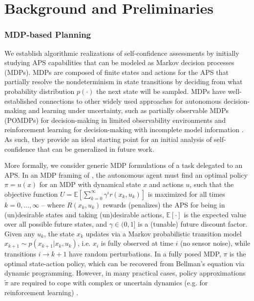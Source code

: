 \section{Background and Preliminaries} \label{sec:background}

\subsubsection{MDP-based Planning} \label{sec:mdp}
We establish algorithmic realizations of self-confidence assessments by initially studying APS capabilities that can be modeled as Markov decision processes (MDPs). MDPs are composed of finite states and actions for the APS that partially resolve the nondeterminism in state transitions by deciding from what probability distribution $p(\cdot)$ the next state will be sampled. %
MDPs have well-established connections to other widely used approaches for autonomous decision-making and learning under uncertainty, such as partially observable MDPs (POMDPs) for decision-making in limited observability environments and reinforcement learning for decision-making with incomplete model information \cite{Kochenderfer2015-uu}. As such, they provide an ideal starting point for an initial analysis of self-confidence that can be generalized in future work. 

More formally, we consider generic MDP formulations of a task \task{} delegated to an APS. In an MDP framing of \task{}, the autonomous agent must find an optimal policy $\pi = u(x)$ for an MDP with dynamical state $x$ and actions $u$, such that the objective function
$U = \mathbb{E} \left[\sum_{k=0}^{\infty} \gamma^i r(x_k,u_k) \right]$ is maximized for all times $k=0,...,\infty$ --  
where $R(x_k,u_k)$ rewards (penalizes) the APS for being in (un)desirable states and taking (un)desirable actions, $\mathbb{E}[\cdot]$ is the expected value over all possible future states, and $\gamma \in (0,1]$ is a (tunable) future discount factor. 
Given any $u_k$, the state $x_k$ updates via a Markov probabilistic transition model $x_{k+1} \sim p(x_{k+1}|x_{k},u_{k})$,  
i.e. $x_{i}$ is fully observed at time $i$ (no sensor noise), while transitions $i\rightarrow k+1$ have random perturbations.
In a fully posed MDP, $\pi$ is the optimal state-action policy, which can be recovered from Bellman's equation via dynamic programming. 
However, in many practical cases, policy approximations $\tilde{\pi}$ are required to cope with complex or uncertain dynamics (e.g. for reinforcement learning) \cite{Kochenderfer2015-uu}. 
    
